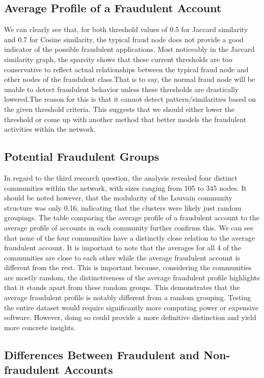 \documentclass{styles/svproc}
\begin{document}
\subsection{Average Profile of a Fraudulent Account}
We can clearly see that, for both threshold values of 0.5 for Jaccard similarity and 0.7 for Cosine similarity, the typical fraud node does not provide a good indicator of the possible fraudulent applications. Most noticeably in the Jaccard similarity graph, the sparsity shows that these current thresholds are too conservative to reflect actual relationships between the typical fraud node and other nodes of the fraudulent class.That is to say, the normal fraud node will be unable to detect fraudulent behavior unless these thresholds are drastically lowered.The reason for this is that it cannot detect pattern/similarities based on the given threshold criteria. This suggests that we should either lower the threshold or come up with another method that better models the fraudulent activities within the network.

\subsection{Potential Fraudulent Groups}
In regard to the third research question, the analysis revealed four distinct communities within the network, with sizes ranging from 105 to 345 nodes. It should be noted however, that the modularity of the Louvain community structure was only 0.16, indicating that the clusters were likely just random groupings. The table comparing the average profile of a fraudulent account to the average profile of accounts in each community further confirms this. We can see that none of the four communities have a distinctly close relation to the average fraudulent account. It is important to note that the averages for all 4 of the communities are close to each other while the average fraudulent account is different from the rest. This is important because, considering the communities are mostly random, the distinctiveness of the average fraudulent profile highlights that it stands apart from these random groups. This demonstrates that the average fraudulent profile is notably different from a random grouping. Testing the entire dataset would require significantly more computing power or expensive software. However, doing so could provide a more definitive distinction and yield more concrete insights.

\subsection{Differences Between Fraudulent and Non-fraudulent Accounts}
\end{document}
